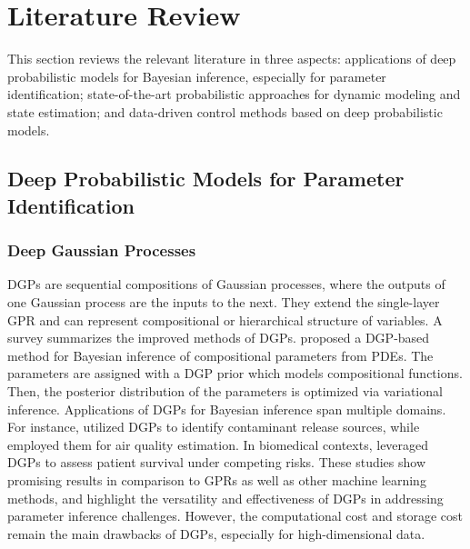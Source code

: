 \section{Literature Review} 
\label{sec:introduction:literature_review}
 This section reviews the relevant literature in three aspects: applications of deep probabilistic models for Bayesian inference, especially for parameter identification; state-of-the-art probabilistic approaches for dynamic modeling and state estimation; and data-driven control methods based on deep probabilistic models.
\subsection{Deep Probabilistic Models for Parameter Identification}  
\subsubsection{Deep Gaussian Processes}
\acfp{DGP} are sequential compositions of Gaussian processes, where the outputs of one Gaussian process are the inputs to the next. They extend the single-layer \ac{GPR} and can represent compositional or hierarchical structure of variables. A survey \citep{jakkala2021survey} summarizes the improved methods of \acp{DGP}. \citeauthor{abraham2023deepgp} \citeyearpar{abraham2023deepgp} proposed a \ac{DGP}-based method for Bayesian inference of compositional parameters from \acp{PDE}. The parameters are assigned with a \ac{DGP} prior which models compositional functions. Then, the posterior distribution of the parameters is optimized via variational inference.
Applications of \acp{DGP} for Bayesian inference span multiple domains. For instance, \citeauthor{dgp2018park} \citeyearpar{dgp2018park} utilized \acp{DGP} to identify contaminant release sources, while \citeauthor{dgp2023desai} \citeyearpar{dgp2023desai} employed them for air quality estimation. In biomedical contexts, \citeauthor{NIPS2017_861dc9bd} \citeyearpar{NIPS2017_861dc9bd} leveraged \acp{DGP} to assess patient survival under competing risks. These studies show promising results in comparison to \acp{GPR} as well as other machine learning methods, and highlight the versatility and effectiveness of \acp{DGP} in addressing parameter inference challenges. However, the computational cost and storage cost remain the main drawbacks of \acp{DGP}, especially for high-dimensional data.

